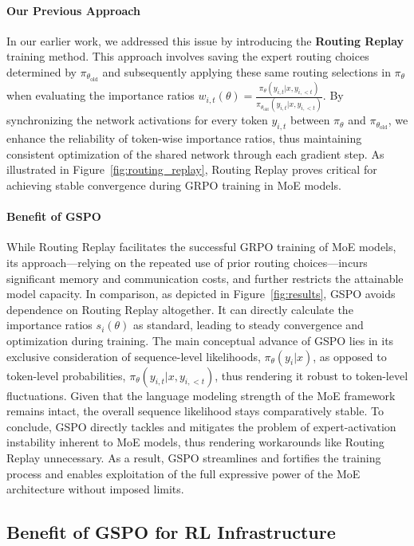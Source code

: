\paragraph{Our Previous Approach} In our earlier work, we addressed this issue by introducing the \textbf{Routing Replay} training method. This approach involves saving the expert routing choices determined by $\pi_{\theta_\text{old}}$ and subsequently applying these same routing selections in $\pi_{\theta}$ when evaluating the importance ratios $w_{i,t}(\theta) = \frac{ \pi_{\theta} (y_{i,t} | x, y_{i,<t}) }{ \pi_{\theta_\text{old}} (y_{i,t} | x,y_{i,<t})}$. By synchronizing the network activations for every token $y_{i,t}$ between $\pi_{\theta}$ and $\pi_{\theta_\text{old}}$, we enhance the reliability of token-wise importance ratios, thus maintaining consistent optimization of the shared network through each gradient step. As illustrated in Figure~\ref{fig:routing_replay}, Routing Replay proves critical for achieving stable convergence during GRPO training in MoE models.

\paragraph{Benefit of GSPO} While Routing Replay facilitates the successful GRPO training of MoE models, its approach—relying on the repeated use of prior routing choices—incurs significant memory and communication costs, and further restricts the attainable model capacity. In comparison, as depicted in Figure~\ref{fig:results}, GSPO avoids dependence on Routing Replay altogether. It can directly calculate the importance ratios $s_i(\theta)$ as standard, leading to steady convergence and optimization during training. The main conceptual advance of GSPO lies in its exclusive consideration of sequence-level likelihoods, $\pi_{\theta} (y_i | x)$, as opposed to token-level probabilities, $\pi_{\theta} (y_{i,t} | x, y_{i,<t})$, thus rendering it robust to token-level fluctuations. Given that the language modeling strength of the MoE framework remains intact, the overall sequence likelihood stays comparatively stable. To conclude, GSPO directly tackles and mitigates the problem of expert-activation instability inherent to MoE models, thus rendering workarounds like Routing Replay unnecessary. As a result, GSPO streamlines and fortifies the training process and enables exploitation of the full expressive power of the MoE architecture without imposed limits.

\subsection{Benefit of GSPO for RL Infrastructure}

